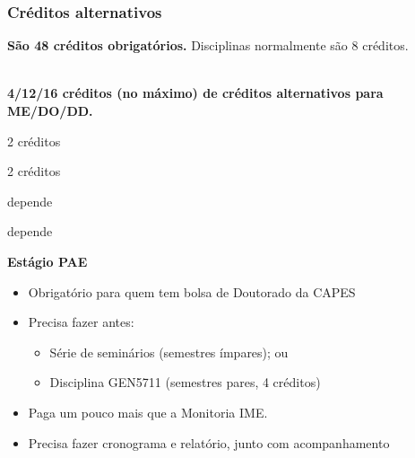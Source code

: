 \documentclass{beamer}
\begin{document}
\begin{frame}
  \frametitle{Créditos alternativos}
  \textbf{São 48 créditos obrigatórios.} Disciplinas normalmente são 8 créditos.\\~\\\pause

  \textbf{4/12/16 créditos (no máximo) de créditos alternativos para ME/DO/DD.}
  \begin{multicols}{2}
  \begin{description}
    \item[Bolsa PAE:] 2 créditos
    \item[Artigos:] 2 créditos\columnbreak
    \item[Disciplinas USP:] depende
    \item[Cursos de verão:] depende
  \end{description}\pause
  \end{multicols}

  \textbf{Estágio PAE}
  \begin{itemize}
    \item Obrigatório para quem tem bolsa de Doutorado da CAPES
    \item Precisa fazer antes:
      \begin{itemize}
        \item Série de seminários (semestres ímpares); ou
        \item Disciplina GEN5711 (semestres pares, 4 créditos)
      \end{itemize}
    \item Paga um pouco mais que a Monitoria IME.
    \item Precisa fazer cronograma e relatório, junto com acompanhamento
  \end{itemize}
\end{frame}
\end{document}
